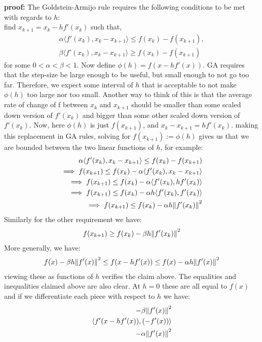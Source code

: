 \documentclass[12pt,a4paper]{article}
\begin{document}
	\textbf{proof:} The Goldstein-Armijo rule requires the following conditions to be met with regards to $h$:\\
	find $x_{k+1} = x_k - hf'(x_k)$ such that, 
	\begin{align*}
		\alpha \langle f'(x_k), x_k - x_{k+1} \rangle \leq f(x_k) - f(x_{k+1}), \\
		\beta \langle f'(x_k), x_k - x_{k+1} \rangle \geq f(x_k) - f(x_{k+1})
	\end{align*} 
	for some $0<\alpha<\beta<1$. Now define $\phi(h) = f(x - hf'(x))$. GA requires that the step-size be large enough to be useful, but small enough to not go too far. Therefore, we expect some interval of $h$ that is acceptable to not make $\phi(h)$ too large nor too small. Another way to think of this is that the average rate of change of f between $x_k$ and $x_{k+1}$ should be smaller than some scaled down version of $f'(x_k)$ and bigger than some other scaled down version of $f'(x_k)$. Now, here $\phi(h)$ is just $f(x_{k+1})$, and $x_{k} - x_{k+1} = hf'(x_k) $. making this replacement in GA rules, solving for $f(x_{k+1}):= \phi(h)$ gives us that we are bounded between the two linear functions of $h$, for example:
	\begin{align*}
		\alpha \langle f'(x_k), x_k - x_{k+1} \rangle \leq f(x_k) - f(x_{k+1}) \\
		\implies f(x_{k+1}) \leq f(x_k) - \alpha \langle f'(x_k), x_k - x_{k+1} \rangle \\
		\implies f(x_{k+1}) \leq f(x_k) - \alpha \langle f'(x_k), hf'(x_k) \rangle \\
		\implies f(x_{k+1}) \leq f(x_k) - \alpha h \langle f'(x_k), f'(x_k) \rangle \\
		\implies f(x_{k+1}) \leq f(x_k) - \alpha h\norm{f'(x_k)}^2
	\end{align*}
	Similarly for the other requirement we have:
	\begin{align*}
		f(x_{k+1}) \geq f(x_k) - \beta h \norm{f'(x_k)}^2
	\end{align*}
	More generally, we have:
	\begin{align*}
		f(x) - \beta h \norm{f'(x)}^2 \leq f(x - hf'(x)) \leq f(x) - \alpha h \norm{f'(x)}^2
	\end{align*}
	viewing these as functions of $h$ verifies the claim above. The equalities and inequalities claimed above are also clear. At $h=0$ these are all equal to $f(x)$ and if we differentiate each piece with respect to $h$ we have:
	\begin{align*}
		-\beta \norm{f'(x)}^2 \\
		\langle f'(x - h f'(x)), (- f'(x)) \rangle \\
		-\alpha \norm{f'(x)}^2
	\end{align*}
\end{document}
